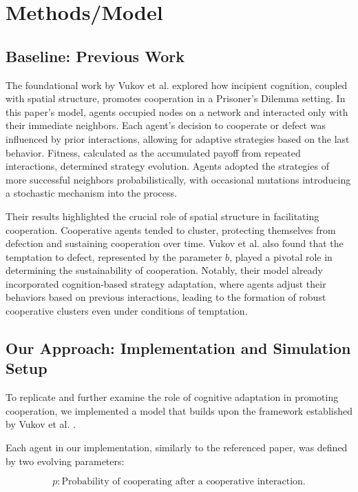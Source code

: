 \documentclass[runningheads]{llncs}
\begin{document}
\section{Methods/Model}

\subsection{Baseline: Previous Work}

The foundational work by Vukov et al. \cite{vukov} explored how incipient cognition, coupled with
spatial structure, promotes cooperation in a Prisoner’s Dilemma setting.
In this paper's model, agents occupied nodes on a network and interacted only with their
immediate neighbors. Each agent's decision to cooperate or defect was influenced
by prior interactions, allowing for adaptive strategies based on the last behavior.
Fitness, calculated as the accumulated payoff from repeated interactions,
determined strategy evolution. Agents adopted the strategies of more successful
neighbors probabilistically, with occasional mutations introducing a stochastic
mechanism into the process.

Their results highlighted the crucial role of spatial structure in facilitating cooperation.
Cooperative agents tended to cluster, protecting themselves from defection and
sustaining cooperation over time. Vukov et al. \cite{vukov} also found that the
temptation to
defect, represented by the parameter \( b \), played a pivotal role in determining
the sustainability of cooperation. Notably, their model already incorporated
cognition-based strategy adaptation, where agents adjust their behaviors based on
previous interactions, leading to the formation of robust cooperative clusters even
under conditions of temptation.


\subsection{Our Approach: Implementation and Simulation Setup}

To replicate and further examine the role of cognitive adaptation in promoting
cooperation, we implemented a model that builds upon the framework established
by Vukov et al. \cite{vukov}.

Each agent in our implementation, similarly to the referenced paper, was defined by
two evolving parameters:

\[
p: \text{Probability of cooperating after a cooperative interaction.}
\]
\end{document}
